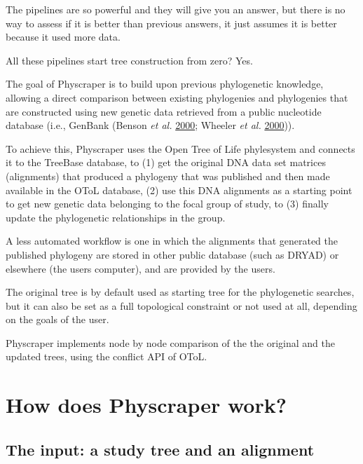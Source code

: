 \documentclass[]{article}
\begin{document}
The pipelines are so powerful and they will give you an answer, but there
is no way to assess if it is better than previous answers, it just assumes it is
better because it used more data.

All these pipelines start tree construction from zero? Yes.

The goal of Physcraper is to build upon previous phylogenetic knowledge,
allowing a direct comparison between existing phylogenies and phylogenies that are constructed
using new genetic data retrieved from a public nucleotide database (i.e., GenBank (Benson \emph{et al.} \protect\hyperlink{ref-benson2000genbank}{2000}; Wheeler \emph{et al.} \protect\hyperlink{ref-wheeler2000database}{2000})).

To achieve this, Physcraper uses the Open Tree of Life phylesystem and connects it
to the TreeBase database, to (1) get the original DNA data set matrices (alignments) that produced
a phylogeny that was published and then made available in the OToL database, (2)
use this DNA alignments as a starting point to get new genetic data belonging
to the focal group of study, to (3) finally update the phylogenetic relationships in the group.

A less automated workflow is one in which the alignments that generated the published
phylogeny are stored in other public database (such as DRYAD) or elsewhere (the users computer), and
are provided by the users.

The original tree is by default used as starting tree for the phylogenetic searches, but it
can also be set as a full topological constraint or not used at all, depending on
the goals of the user.

Physcraper implements node by node comparison of the the original and the updated trees, using the conflict API of OToL.

\hypertarget{how-does-physcraper-work}{%
\section{How does Physcraper work?}\label{how-does-physcraper-work}}

\hypertarget{the-input-a-study-tree-and-an-alignment}{%
\subsection{The input: a study tree and an alignment}\label{the-input-a-study-tree-and-an-alignment}}
\end{document}
